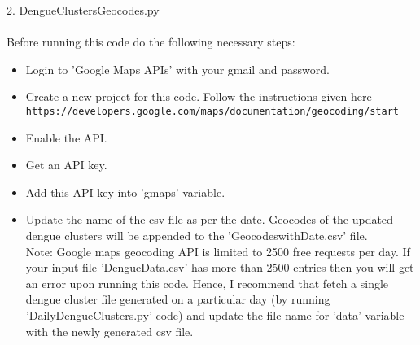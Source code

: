 \documentclass[11pt]{exam}
\begin{document}
\begin{questions}
2. DengueClustersGeocodes.py \\ \\
Before running this code do the following necessary steps: \\
\begin{itemize}
\item Login to 'Google Maps APIs' with your gmail and password. \\ 
\item Create a new project for this code. Follow the instructions given here\\ \texttt{\url{https://developers.google.com/maps/documentation/geocoding/start}} \\
\item Enable the API.\\
\item Get an API key.\\
\item Add this API key into 'gmaps' variable.\\
\item Update the name of the csv file as per the date. Geocodes of the updated dengue clusters will be appended to the 'GeocodeswithDate.csv' file.\\ Note: Google maps geocoding API is limited to 2500 free requests per day. If your input file 'DengueData.csv' has more than 2500 entries then you will get an error upon running this code. Hence, I recommend that fetch a single dengue cluster file generated on a particular day (by running 'DailyDengueClusters.py' code) and update the file name for 'data' variable with the newly generated csv file.\\

\end{itemize} 





%
%
%
%


\end{questions}
\end{document}
